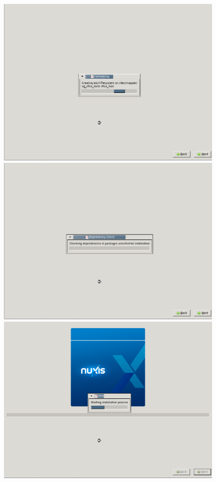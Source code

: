 \begin{figure}[H]
\begin{center}
	\includegraphics[scale=0.2]{screenshots/install/unitbox/format_disks_02.png}
	\includegraphics[scale=0.2]{screenshots/install/unitbox/check_dependencies.png}
	\includegraphics[scale=0.2]{screenshots/install/unitbox/start_install.png}

\end{center}
\end{figure}
